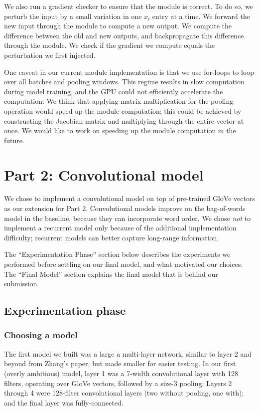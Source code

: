 \documentclass{article}
\begin{document}
We also run a gradient checker to ensure that the module is correct. To do so, we perturb the input by a small variation in one $x_i$ entry at a time. We forward the new input through the module to compute a new output. We compute the difference between the old and new outputs, and backpropagate this difference through the module. We check if the gradient we compute equals the perturbation we first injected. 

One caveat in our current module implementation is that we use for-loops to loop over all batches and pooling windows. This regime results in slow computation during model training, and the GPU could not efficiently accelerate the computation. We think that applying matrix multiplication for the pooling operation would speed up the module computation; this could be achieved by constructing the Jacobian matrix and multiplying through the entire vector at once. We would like to work on speeding up the module computation in the future. 

\section*{Part 2: Convolutional model}

We chose to implement a convolutional model on top of pre-trained GloVe vectors as our extension for Part 2. Convolutional models improve on the bag-of-words model in the baseline, because they can incorporate word order. We chose \emph{not} to implement a recurrent model only because of the additional implementation difficulty; recurrent models can better capture long-range information.

The ``Experimentation Phase'' section below describes the experiments we performed before settling on our final model, and what motivated our choices. The ``Final Model'' section explains the final model that is behind our submission.

\subsection*{Experimentation phase}

\subsubsection*{Choosing a model}

The first model we built was a large a multi-layer network, similar to layer 2 and beyond from Zhang's paper, but made smaller for easier testing. In our first (overly ambitious) model, layer 1 was a 7-width convolutional layer with 128 filters, operating over GloVe vectors, followed by a size-3 pooling; Layers 2 through 4 were 128-filter convolutional layers (two without pooling, one with); and the final layer was fully-connected.
\end{document}
